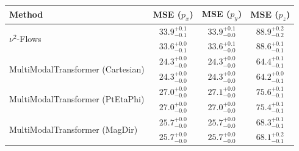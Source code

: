     \begin{tabular}{lccc}
        \toprule
        Method & MSE ($p_x$) & MSE ($p_y$) & MSE ($p_z$) \\
        \midrule
         \multirow{2}{*}{$\nu^2$-Flows}& $33.9_{-0.1}^{+0.1}$ & $33.9_{-0.0}^{+0.1}$ & $88.9_{-0.2}^{+0.2}$ \\
         & $33.6_{-0.1}^{+0.0}$ & $33.6_{-0.0}^{+0.1}$ & $88.6_{-0.1}^{+0.1}$ \\
        \midrule
         \multirow{2}{*}{MultiModalTransformer (Cartesian)}& $24.3_{-0.0}^{+0.0}$ & $24.3_{-0.0}^{+0.0}$ & $64.4_{-0.1}^{+0.1}$ \\
         & $24.3_{-0.0}^{+0.0}$ & $24.3_{-0.0}^{+0.0}$ & $64.2_{-0.1}^{+0.0}$ \\
        \midrule
         \multirow{2}{*}{MultiModalTransformer (PtEtaPhi)}& $27.0_{-0.0}^{+0.0}$ & $27.1_{-0.0}^{+0.0}$ & $75.6_{-0.1}^{+0.1}$ \\
         & $27.0_{-0.0}^{+0.0}$ & $27.0_{-0.0}^{+0.0}$ & $75.4_{-0.1}^{+0.1}$ \\
        \midrule
         \multirow{2}{*}{MultiModalTransformer (MagDir)}& $25.7_{-0.0}^{+0.0}$ & $25.7_{-0.0}^{+0.0}$ & $68.3_{-0.1}^{+0.1}$ \\
         & $25.7_{-0.0}^{+0.0}$ & $25.7_{-0.0}^{+0.0}$ & $68.1_{-0.1}^{+0.2}$ \\
        \bottomrule
    \end{tabular}